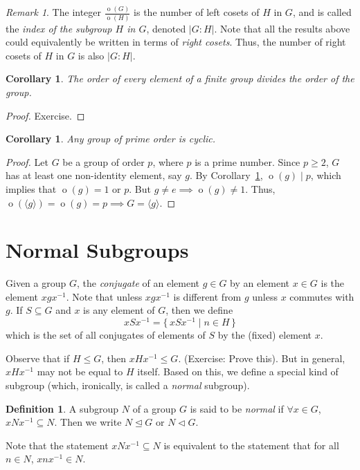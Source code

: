 \documentclass[svgnames]{article}
\newtheorem{Corollary}[Theorem]{Corollary}
\theoremstyle{definition}
\newtheorem{Definition}[Theorem]{Definition}
\theoremstyle{remark}
\newtheorem*{Remark*}{Remark}
\DeclareMathOperator{\ord}{o}
\begin{document}
\begin{Remark*}\label{def:SubgroupIndex}
The integer $\frac{\ord(G)}{\ord(H)}$ is the number of left cosets of $H$ in $G$, and is called the \emph{index of the subgroup $H$ in $G$}, denoted $|G : H|$. Note that all the results above could equivalently be written in terms of \emph{right cosets}. Thus, the number of right cosets of $H$ in $G$ is also $|G : H|$.
\end{Remark*}

\begin{Corollary}\label{cor:OrderElem}
The order of every element of a finite group divides the order of the group.
\end{Corollary}
\begin{proof}
Exercise.
\end{proof}

\begin{Corollary}\label{cor:Prime=>Cyc}
Any group of prime order is cyclic.
\end{Corollary}
\begin{proof}
Let $G$ be a group of order $p$, where $p$ is a prime number. Since $p \ge 2$, $G$ has at least one non-identity element, say $g$. By Corollary~\ref{cor:OrderElem}, $\ord(g) \mid p$, which implies that $\ord(g) = 1$ or $p$. But $g \ne e \implies \ord(g) \ne 1$. Thus, $\ord(\langle g \rangle) = \ord(g) = p \implies G = \langle g \rangle$.
\end{proof}

\section{Normal Subgroups}\label{sec:NormSubs}
Given a group $G$, the \emph{conjugate} of an element $g \in G$ by an element $x \in G$ is the element $xgx^{-1}$. Note that unless $xgx^{-1}$ is different from $g$ unless $x$ commutes with $g$. If $S \subseteq G$ and $x$ is any element of $G$, then we define
\begin{equation*}
xSx^{-1} = \{\, xSx^{-1} \mid n \in H \,\}
\end{equation*}
which is the set of all conjugates of elements of $S$ by the (fixed) element $x$.

Observe that if $H \le G$, then $xHx^{-1} \le G$. {\small (Exercise: Prove this)}. But in general, $xHx^{-1}$ may not be equal to $H$ itself. Based on this, we define a special kind of subgroup (which, ironically, is called a \emph{normal} subgroup).

\begin{Definition}\label{def:NormSubgroup}
A subgroup $N$ of a group $G$ is said to be \emph{normal} if $\forall x \in G$, $xNx^{-1} \subseteq N$. Then we write $N \unlhd G$ or $N \lhd G$.
\end{Definition}
Note that the statement $xNx^{-1} \subseteq N$ is equivalent to the statement that for all $n \in N$, $xnx^{-1} \in N$.
\end{document}
